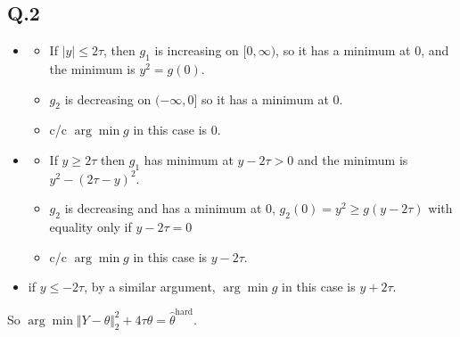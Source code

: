 \documentclass[12pt]{article}
\newcommand{\Q}[1]{\subsection*{Q.#1}}
\newenvironment{question}[1]
{\Q{#1}}{}
\begin{document}
\begin{question}{2}
\begin{itemize}
  \begin{itemize}
  \item
    \begin{itemize}
    \item If $|y| \le 2\tau$, then $g_1$ is increasing on  $[0, \infty)$, so it has a minimum at $0$, and the minimum is   $y^2 = g(0)$.
    \item   $g_2$ is decreasing on $(-\infty, 0]$ so it has a  minimum at 0.
    \item   c/c $\arg\min g$ in this case is 0.
    \end{itemize}

  \item
    \begin{itemize}
    \item If $y \ge 2\tau$ then $g_1$ has minimum at $y - 2\tau > 0$  and the minimum is $ y^2 - (2\tau-y)^2$.
    \item   $g_2$ is decreasing  and has a minimum at 0, $g_2(0) = y^2 \ge g(y-2\tau)$ with equality only if $y-2\tau = 0$
    \item c/c  $\arg\min g$ in this case is $y - 2\tau$.
    \end{itemize}

  \item if $y \le -2\tau$, by a similar argument, $\arg\min g$ in this
    case is $y + 2\tau$.
  \end{itemize}
  
  So
  $\arg\min \Vert Y - \theta\Vert _2^2 + 4\tau \theta = \hat
  \theta^{\text{hard}}$.
\end{itemize}
\end{question}
\end{document}
